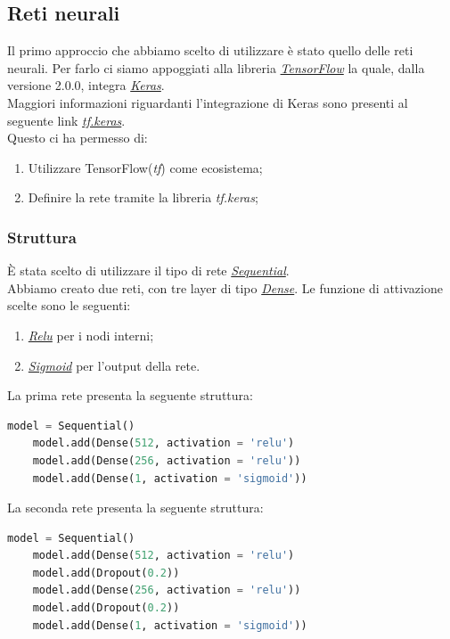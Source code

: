 \subsection{Reti neurali}
Il primo approccio che abbiamo scelto di utilizzare è stato quello delle reti neurali.
Per farlo ci siamo appoggiati alla libreria \href{https://www.tensorflow.org/}{\textit{TensorFlow}} la quale, dalla versione 2.0.0, integra \href{https://keras.io/}{\textit{Keras}}.\\
Maggiori informazioni riguardanti l'integrazione di Keras sono presenti al seguente link \href{https://www.tensorflow.org/guide/keras}{\textit{tf.keras}}.\\ 
Questo ci ha permesso di:
\begin{enumerate}
\item Utilizzare TensorFlow(\textit{tf}) come ecosistema;
\item Definire la rete tramite la libreria \textit{tf.keras};
\end{enumerate} 
\subsubsection{Struttura}
È stata scelto di utilizzare il tipo di rete \href{https://keras.io/getting-started/sequential-model-guide/}{\textit{Sequential}}.\\ 
Abbiamo creato due reti, con tre layer di tipo \href{https://keras.io/layers/core/}{\textit{Dense}}.
Le funzione di attivazione scelte sono le seguenti:
\begin{enumerate}
\item \href{https://keras.io/activations/#relu}{\textit{Relu}} per i nodi interni;
\item \href{https://keras.io/activations/#sigmoid}{\textit{Sigmoid}} per l'output della rete.
\end{enumerate}
La prima rete presenta la seguente struttura:
\begin{lstlisting}[language=Python]
	model = Sequential()  
	model.add(Dense(512, activation = 'relu')
	model.add(Dense(256, activation = 'relu'))
	model.add(Dense(1, activation = 'sigmoid'))
\end{lstlisting}

La seconda rete presenta la seguente struttura:
\begin{lstlisting}[language=Python]
	model = Sequential()
	model.add(Dense(512, activation = 'relu')
	model.add(Dropout(0.2))
	model.add(Dense(256, activation = 'relu'))
	model.add(Dropout(0.2))
	model.add(Dense(1, activation = 'sigmoid'))
\end{lstlisting}
	 
